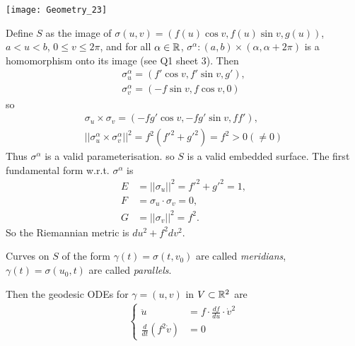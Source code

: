 \documentclass[a4paper]{article}
\begin{document}
\texttt{[image: Geometry\_23]}

Define $S$ as the image of $\sigma(u,v) = (f(u) \cos v, f(u) \sin v, g(u))$, $a<u<b$, $0 \leq v \leq 2\pi$, and for all $\alpha \in \mathbb{R}$, $\sigma^\alpha:(a,b) \times (\alpha,\alpha+2\pi)$ is a homomorphism onto its image (see Q1 sheet 3). Then
\begin{equation*}
\begin{aligned}
\sigma_u^\alpha = (f'\cos v, f'\sin v, g'),\\
\sigma_v^\alpha = (-f\sin v, f\cos v, 0)
\end{aligned}
\end{equation*}
so
\begin{equation*}
\begin{aligned}
\sigma_u \times \sigma_v =(-fg'\cos v, -fg' \sin v, ff'),\\
||\sigma_u^\alpha \times \sigma_v^\alpha||^2 = f^2(f'^2+g'^2) = f^2 > 0 (\neq 0)
\end{aligned}
\end{equation*}
Thus $\sigma^\alpha$ is a valid parameterisation. so $S$ is a valid embedded surface. The first fundamental form w.r.t. $\sigma^\alpha$ is
\begin{equation*}
\begin{aligned}
E &= ||\sigma_u||^2 = f'^2+g'^2 = 1,\\
F &= \sigma_u \cdot \sigma_v = 0,\\
G &= ||\sigma_v||^2 = f^2.
\end{aligned}
\end{equation*}
So the Riemannian metric is $du^2 + f^2 dv^2$.

\begin{defi}
Curves on $S$ of the form $\gamma(t) = \sigma(t,v_0)$ are called \emph{meridians}, $\gamma(t) = \sigma(u_0,t)$ are called \emph{parallels}.
\end{defi}

Then the geodesic ODEs for $\gamma=(u,v)$ in $V \subset \mathbb{R}^2$ are
\begin{equation*}
\begin{aligned}
\left\{\begin{array}{ll}
\ddot{u} &= f \cdot \frac{df}{du} \cdot \dot{v}^2\\
\frac{d}{dt}(f^2 \dot{v}) &= 0
\end{array}\right.
\end{aligned}
\end{equation*}
\end{document}
